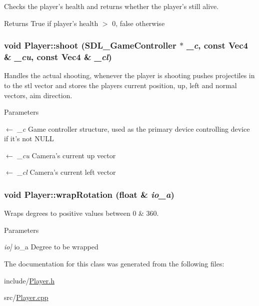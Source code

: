 Checks the player's health and returns whether the player's still alive. \begin{DoxyReturn}{Returns}
True if player's health $>$ 0, false otherwise 
\end{DoxyReturn}
\hypertarget{classPlayer_acf17b0c4c70aae116360032f44f50012}{
\subsubsection[{shoot}]{\setlength{\rightskip}{0pt plus 5cm}void Player::shoot (SDL\_\-GameController $\ast$ {\em \_\-c}, \/  const {\bf Vec4} \& {\em \_\-cu}, \/  const {\bf Vec4} \& {\em \_\-cl})}}
\label{classPlayer_acf17b0c4c70aae116360032f44f50012}


Handles the actual shooting, whenever the player is shooting pushes projectiles in to the stl vector and stores the players current position, up, left and normal vectors, aim direction. 
\begin{DoxyParams}{Parameters}
\item[\mbox{$\leftarrow$} {\em \_\-c}]Game controller structure, used as the primary device controlling device if it's not NULL \item[\mbox{$\leftarrow$} {\em \_\-cu}]Camera's current up vector \item[\mbox{$\leftarrow$} {\em \_\-cl}]Camera's current left vector \end{DoxyParams}
\hypertarget{classPlayer_ad13442ce6259aacf5e02ea1a76826ca9}{
\subsubsection[{wrapRotation}]{\setlength{\rightskip}{0pt plus 5cm}void Player::wrapRotation (float \& {\em io\_\-a})}}
\label{classPlayer_ad13442ce6259aacf5e02ea1a76826ca9}


Wraps degrees to positive values between 0 \& 360. 
\begin{DoxyParams}{Parameters}
\item[{\em io\mbox{]}}]io\_\-a Degree to be wrapped \end{DoxyParams}


The documentation for this class was generated from the following files:\begin{DoxyCompactItemize}
\item 
include/\hyperlink{Player_8h}{Player.h}\item 
src/\hyperlink{Player_8cpp}{Player.cpp}\end{DoxyCompactItemize}
